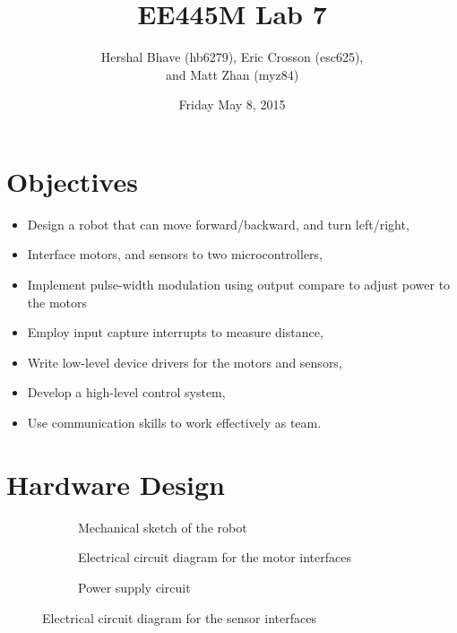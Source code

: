 \documentclass[12pt]{article}
\title{EE445M Lab 7}
\author{Hershal Bhave (hb6279), Eric Crosson (esc625), \\
  and Matt Zhan (myz84)}
\date{Friday May 8, 2015}
\begin{document}
\maketitle

\section{Objectives}

\begin{itemize}
\item Design a robot that can move forward/backward, and turn left/right,
\item Interface motors, and sensors to two microcontrollers,
\item Implement pulse-width modulation using output compare to adjust power to the motors
\item Employ input capture interrupts to measure distance,
\item Write low-level device drivers for the motors and sensors,
\item Develop a high-level control system,
\item Use communication skills to work effectively as team.
\end{itemize}

\section{Hardware Design}

\begin{figure}[H]
  \centering
  \begin{subfigure}[b]{0.45\textwidth}
    \caption{Mechanical sketch of the robot}
    \label{fig:mechanical-sketch}
  \end{subfigure}
  \begin{subfigure}[b]{0.45\textwidth}
    \caption{Electrical circuit diagram for the motor interfaces}
    \label{fig:motor-interface}
  \end{subfigure}
  \begin{subfigure}[b]{0.45\textwidth}
    \caption{Power supply circuit}
    \label{fig:power-supply}
  \end{subfigure}
  \caption{Electrical circuit diagram for the sensor interfaces}
  \label{fig:sensor-interface}
\end{figure}
\end{document}

